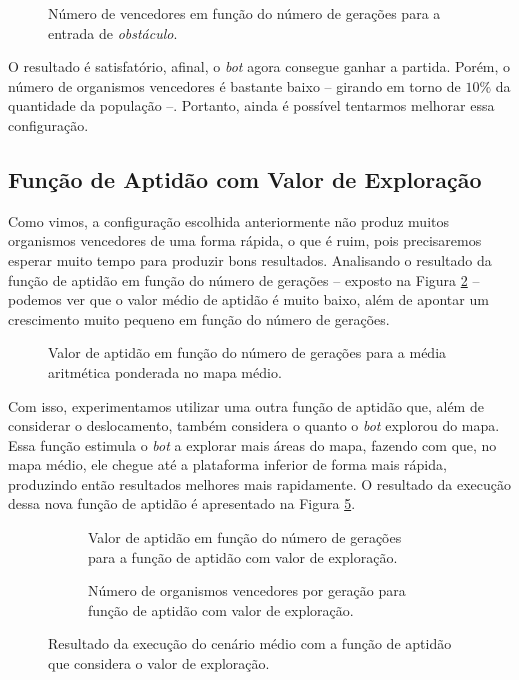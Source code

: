 \begin{figure}[H]
\caption{Número de vencedores em função do número de gerações para a
entrada de \textit{obstáculo}.}
\label{fig:obstacle-input-wam-winners}
\end{figure}

O resultado é satisfatório, afinal, o \textit{bot} agora consegue ganhar a
partida. Porém, o número de organismos vencedores é bastante baixo -- girando
em torno de $10\%$ da quantidade da população --. Portanto, ainda é possível
tentarmos melhorar essa configuração.

\subsection{Função de Aptidão com Valor de Exploração}

Como vimos, a configuração escolhida anteriormente não produz muitos organismos
vencedores de uma forma rápida, o que é ruim, pois precisaremos esperar muito
tempo para produzir bons resultados. Analisando o resultado da função de
aptidão em função do número de gerações -- exposto na Figura
\ref{fig:obstacle-input-wam-fitness} -- podemos ver que o valor médio de
aptidão é muito baixo, além de apontar um crescimento muito pequeno em função
do número de gerações.

\begin{figure}[H]
\caption{Valor de aptidão em função do número de gerações para a média
aritmética ponderada no mapa médio.}
\label{fig:obstacle-input-wam-fitness}
\end{figure}

Com isso, experimentamos utilizar uma outra função de aptidão que, além de
considerar o deslocamento, também considera o quanto o \textit{bot} explorou do
mapa. Essa função estimula o \textit{bot} a explorar mais áreas do mapa,
fazendo com que, no mapa médio, ele chegue até a plataforma inferior de forma
mais rápida, produzindo então resultados melhores mais rapidamente. O resultado
da execução dessa nova função de aptidão é apresentado na Figura
\ref{fig:obstacle-input-ex-fitness}.

\begin{figure}[H]
\centering
	\begin{subfigure}[b]{0.4\textwidth}
        \caption{Valor de aptidão em função do número de gerações para a função
        de aptidão com valor de exploração.}
		\label{fig:tbd1}
	\end{subfigure}
	\begin{subfigure}[b]{0.4\textwidth}
        \caption{Número de organismos vencedores por geração para função de
        aptidão com valor de exploração.}
		\label{fig:tbd1}
	\end{subfigure}

    \caption{Resultado da execução do cenário médio com a função de aptidão que
    considera o valor de exploração.}
    \label{fig:obstacle-input-ex-fitness}
\end{figure}

